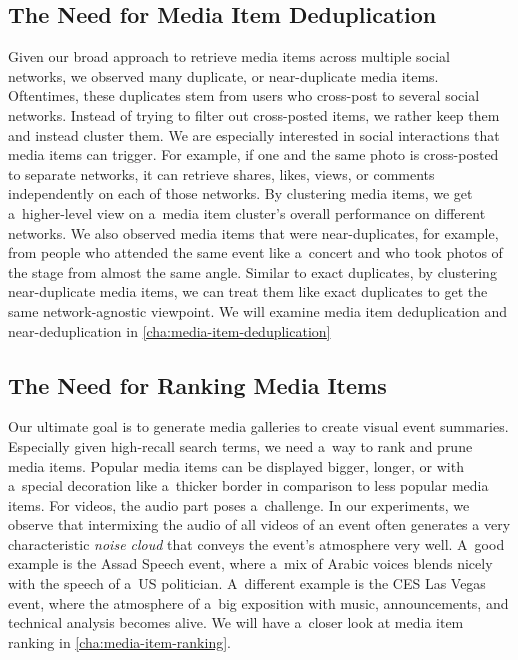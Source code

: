 \subsection{The Need for Media Item Deduplication}
\label{sec:the-need-for-media-item-deduplication}

Given our broad approach to retrieve media items
across multiple social networks,
we observed many duplicate, or near-duplicate media items.
Oftentimes, these duplicates stem from users who
cross-post to several social networks.
Instead of trying to filter out cross-posted items,
we rather keep them and instead cluster them.
We are especially interested in social interactions
that media items can trigger.
For example, if one and the same photo
is cross-posted to separate networks,
it can retrieve shares, likes, views, or comments
independently on each of those networks.
By clustering media items, we get a~higher-level view on
a~media item cluster's overall performance on different networks.
We also observed media items that were near-duplicates,
for example, from people who attended the same event like a~concert
and who took photos of the stage from almost the same angle.
Similar to exact duplicates,
by clustering near-duplicate media items,
we can treat them like exact duplicates to get the same
network-agnostic viewpoint.
We will examine media item deduplication and near-deduplication
in \autoref{cha:media-item-deduplication}

\subsection{The Need for Ranking Media Items}

Our ultimate goal is to generate media galleries
to create visual event summaries.
Especially given high-recall search terms,
we need a~way to rank and prune media items.
Popular media items can be displayed bigger, longer,
or with a~special decoration like a~thicker border
in comparison to less popular media items.
For videos, the audio part poses a~challenge.
In our experiments, we observe that intermixing the audio
of all videos of an event often generates
a very characteristic \emph{noise cloud}
that conveys the event's atmosphere very well.
A~good example is the Assad Speech event,
where a~mix of Arabic voices blends nicely
with the speech of a~US politician.
A~different example is the CES Las Vegas event,
where the atmosphere of a~big exposition with music,
announcements, and technical analysis becomes alive.
We will have a~closer look at media item ranking in
\autoref{cha:media-item-ranking}.

